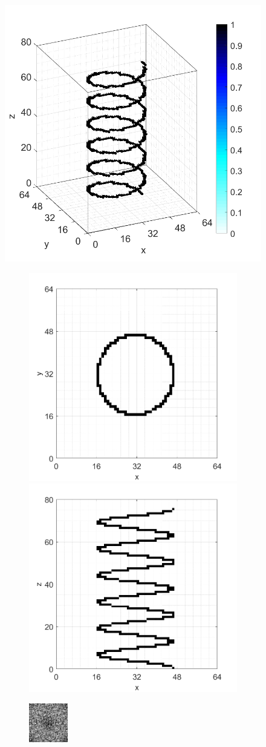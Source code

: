 \documentclass[9pt,twocolumn,twoside]{osajnl}
\begin{document}
\begin{figure}[htbp]
\begin{minipage}[b]{1\textwidth}
\centering
\includegraphics[width=0.18\columnwidth]{cirhelix}
\begin{subfigure}[b]{0.18\textwidth}
  \centering
  \includegraphics[width=0.45\columnwidth]{cirhelix_top}

  \includegraphics[width=0.45\columnwidth]{cirhelix_side}
\end{subfigure}
\begin{subfigure}[b]{0.18\textwidth}
  \centering
  \includegraphics[width=0.45\columnwidth]{cirhelix_complex_holo}


\end{subfigure}
\end{minipage}
\end{figure}
\end{document}
